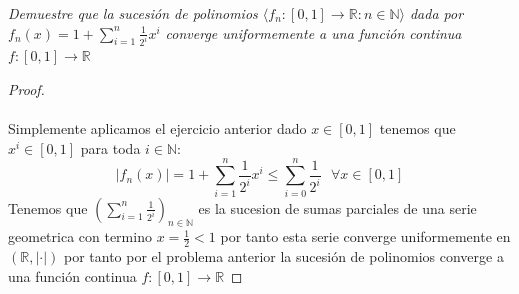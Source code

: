 \documentclass[11pt,letterpaper]{article}
\newcommand{\R}{\mathbb{R}}
\newcommand{\N}{\mathbb{N}}
\begin{document}
\begin{tcolorbox}[
	title = \textcolor{black}{\textcolor{white}{Problema 3}},]
\textit{Demuestre que la sucesi\'on de polinomios  $\langle f_n:[0,1]\to\R:n\in \N\rangle$ dada por
$f_n(x)=1+\sum_{i=1}^n\frac{1}{2^i}x^i$ converge uniformemente a una funci\'on continua $f:[0,1]\to \R$
}
\end{tcolorbox}
\begin{proof}\,\\
    \,\\
    Simplemente aplicamos el ejercicio anterior dado $x\in [0,1]$ tenemos que $x^i\in[0,1]$ para toda $i\in \N$:\,\\
    \begin{equation*}
        |f_n(x)|=1+\sum_{i=1}^n\frac{1}{2^i}x^i\leq \sum_{i=0}^n\frac{1}{2^i}\,\,\,\,\forall x\in[0,1]
    \end{equation*}
    Tenemos que $(\sum_{i=1}^n\frac{1}{2^i})_{n\in \N}$ es la sucesion de sumas parciales de una serie geometrica con termino $x=\frac{1}{2}<1$ por tanto esta serie converge uniformemente en $(\R,|\cdot|)$ por tanto por el problema anterior
    la sucesi\'on de polinomios converge a una funci\'on continua $f:[0,1]\to \R$
\end{proof}
\end{document}
